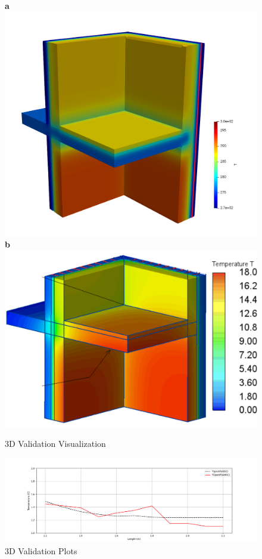 \begin{figure}[tbh]
    \centering
    \textbf{a}\includegraphics[width=0.65\columnwidth]{Figures/casewoutair.png}
    \textbf{b}\includegraphics[width=0.65\columnwidth]{Figures/ValidationCaseClean.png}
\hspace{0.7cm}
    \caption{3D Validation Visualization}
    \label{paraview}
\end{figure}




\begin{figure}[tbh] 
\centering
\includegraphics[width=0.8\columnwidth]{Figures/Figure_2.png}
\hspace{0.7cm}
\caption[33D Validation Plots]{3D Validation Plots}
\label{fig:validation-plots}
\end{figure}



